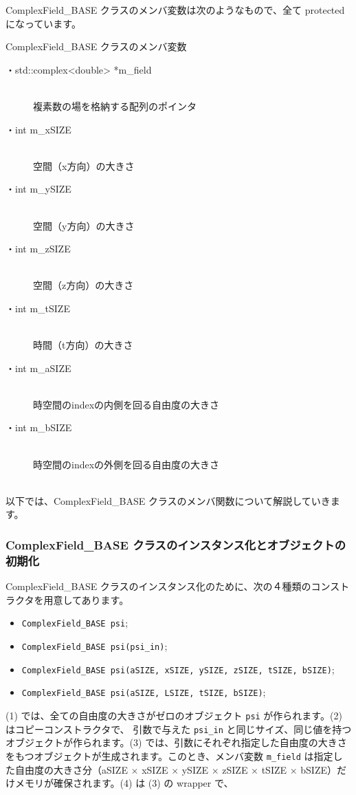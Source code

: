 \documentclass[12pt, a4paper]{jsarticle}
\begin{document}
ComplexField\_BASE クラスのメンバ変数は次のようなもので、全て protected になっています。\\
\begin{itembox}[l]{ComplexField\_BASE クラスのメンバ変数}
	\begin{description}
		\item[・std::complex<double> *m\_field] \mbox{} \\
		複素数の場を格納する配列のポインタ
		\item[・int m\_xSIZE] \mbox{} \\
		空間（x方向）の大きさ
		\item[・int m\_ySIZE] \mbox{} \\
		空間（y方向）の大きさ
		\item[・int m\_zSIZE] \mbox{} \\
		空間（z方向）の大きさ
		\item[・int m\_tSIZE] \mbox{} \\
		時間（t方向）の大きさ
		\item[・int m\_aSIZE] \mbox{} \\
		時空間のindexの内側を回る自由度の大きさ
		\item[・int m\_bSIZE] \mbox{} \\
		時空間のindexの外側を回る自由度の大きさ
	\end{description}
\end{itembox} \\

以下では、ComplexField\_BASE クラスのメンバ関数について解説していきます。

\subsubsection{ComplexField\_BASE クラスのインスタンス化とオブジェクトの初期化}
ComplexField\_BASE クラスのインスタンス化のために、次の４種類のコンストラクタを用意してあります。
\begin{itemize}
	\item[(1)] \verb#ComplexField_BASE psi#;
	\item[(2)] \verb#ComplexField_BASE psi(psi_in)#;
	\item[(3)] \verb#ComplexField_BASE psi(aSIZE, xSIZE, ySIZE, zSIZE, tSIZE, bSIZE)#;
	\item[(4)] \verb#ComplexField_BASE psi(aSIZE, LSIZE, tSIZE, bSIZE)#;
\end{itemize}
(1) では、全ての自由度の大きさがゼロのオブジェクト {\verb#psi#} が作られます。(2) はコピーコンストラクタで、 引数で与えた {\verb#psi_in#} と同じサイズ、同じ値を持つオブジェクトが作られます。(3) では、引数にそれぞれ指定した自由度の大きさをもつオブジェクトが生成されます。このとき、メンバ変数 {\verb#m_field#} は指定した自由度の大きさ分（aSIZE $\times$ xSIZE $\times$ ySIZE $\times$ zSIZE $\times$ tSIZE $\times$ bSIZE）だけメモリが確保されます。(4) は (3) の wrapper で、
\end{document}
